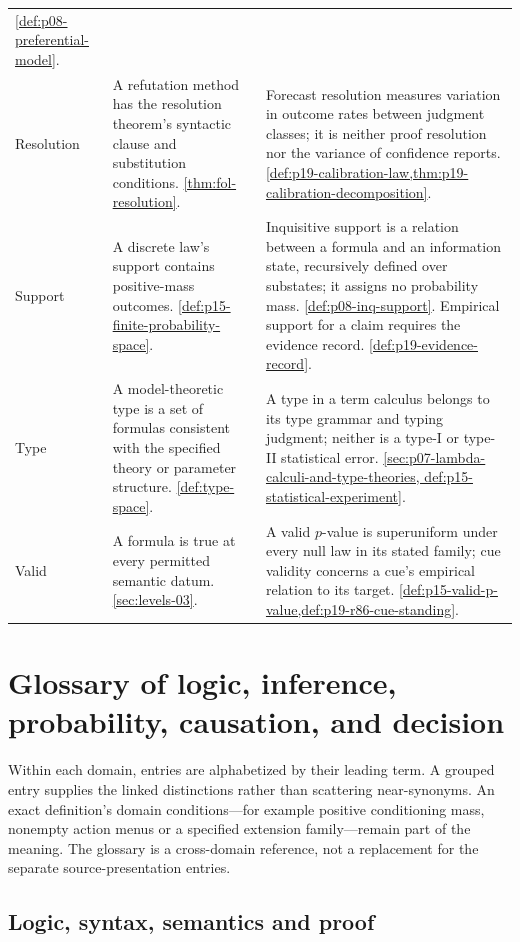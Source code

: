 \begin{longtable}{@{}p{}p{}p{}@{}}
\cref{def:p08-preferential-model}. \\
Resolution & A refutation method has the resolution theorem's syntactic
clause and substitution conditions. \cref{thm:fol-resolution}. & Forecast
resolution measures variation in outcome rates between judgment classes;
it is neither proof resolution nor the variance of confidence reports.
\cref{def:p19-calibration-law,thm:p19-calibration-decomposition}. \\
Support & A discrete law's support contains positive-mass outcomes.
\cref{def:p15-finite-probability-space}. & Inquisitive support is a relation
between a formula and an information state, recursively defined over
substates; it assigns no probability mass. \cref{def:p08-inq-support}.
Empirical support for a claim requires the evidence record.
\cref{def:p19-evidence-record}. \\
Type & A model-theoretic type is a set of formulas consistent with the
specified theory or parameter structure. \cref{def:type-space}. & A type
in a term calculus belongs to its type grammar and typing judgment; neither
is a type-I or type-II statistical error.
\cref{sec:p07-lambda-calculi-and-type-theories,
def:p15-statistical-experiment}. \\
Valid & A formula is true at every permitted semantic datum.
\cref{sec:levels-03}. & A valid \(p\)-value is superuniform under every null
law in its stated family; cue validity concerns a cue's empirical relation
to its target. \cref{def:p15-valid-p-value,def:p19-r86-cue-standing}. \\
\bottomrule
\end{longtable}

\section{Glossary of logic, inference, probability, causation, and decision}
\label{sec:p14-glossary-domains}


Within each domain, entries are alphabetized by their leading term. A grouped
entry supplies the linked distinctions rather than scattering near-synonyms.
An exact definition's domain conditions---for example positive conditioning
mass, nonempty action menus or a specified extension family---remain part of
the meaning. The glossary is a cross-domain reference, not a replacement for
the separate source-presentation entries.

\subsection{Logic, syntax, semantics and proof}
\label{sec:p14-glossary-logic}

